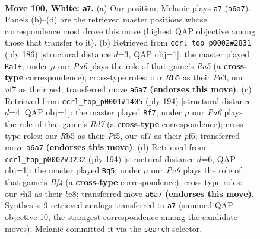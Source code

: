 \documentclass[11pt]{article}
\begin{document}
\clearpage

\begin{figure}[p]\centering
\begin{subfigure}{0.46\textwidth}\centering
\resizebox{\linewidth}{!}{%
\newchessgame
\chessboard[
  setfen={8/3k1n2/P7/1R6/8/7r/4K3/8 w - - 27 100},
  showmover=false,
  pgfstyle=straightmove, color=movearrow, markmove={a6-a7}
]}
\caption{}
\end{subfigure}\hfill
\begin{subfigure}{0.46\textwidth}\centering
\resizebox{\linewidth}{!}{%
\newchessgame
\chessboard[
  setfen={8/7r/8/R7/4p3/4P3/6K1/3k4 w - - 8 94},
  showmover=false,
  pgfstyle=straightmove, color=movearrow, markmove={a5-a1}
]}
\caption{}
\end{subfigure}
\\[4pt]
\begin{subfigure}{0.46\textwidth}\centering
\resizebox{\linewidth}{!}{%
\newchessgame
\chessboard[
  setfen={8/3R4/5p1k/5P2/1r6/5K2/8/8 w - - 8 98},
  showmover=false,
  pgfstyle=straightmove, color=movearrow, markmove={d7-f7}
]}
\caption{}
\end{subfigure}\hfill
\begin{subfigure}{0.46\textwidth}\centering
\resizebox{\linewidth}{!}{%
\newchessgame
\chessboard[
  setfen={4b3/8/k7/2K5/5B2/7R/1n6/8 w - - 85 98},
  showmover=false,
  pgfstyle=straightmove, color=movearrow, markmove={f4-g5}
]}
\caption{}
\end{subfigure}
\caption{\textbf{Move 100, White: \texttt{a7}.} (a) Our position; Melanie plays \texttt{a7} (\texttt{a6a7}). Panels (b)--(d) are the retrieved master positions whose correspondence most drove this move (highest QAP objective among those that transfer to it). (b) Retrieved from \texttt{ccrl\_top\_p0002\#2831} (ply 186) [structural distance $d$=3, QAP obj=1]: the master played \texttt{Ra1+}; under $\mu$ our \emph{Pa6} plays the role of that game's \emph{Ra5} (a \textbf{cross-type} correspondence); cross-type roles: our \emph{R}b5 as their \emph{P}e3, our \emph{n}f7 as their \emph{p}e4; transferred move \texttt{a6a7} \textbf{(endorses this move)}. (c) Retrieved from \texttt{ccrl\_top\_p0001\#1405} (ply 194) [structural distance $d$=4, QAP obj=1]: the master played \texttt{Rf7}; under $\mu$ our \emph{Pa6} plays the role of that game's \emph{Rd7} (a \textbf{cross-type} correspondence); cross-type roles: our \emph{R}b5 as their \emph{P}f5, our \emph{n}f7 as their \emph{p}f6; transferred move \texttt{a6a7} \textbf{(endorses this move)}. (d) Retrieved from \texttt{ccrl\_top\_p0002\#3232} (ply 194) [structural distance $d$=6, QAP obj=1]: the master played \texttt{Bg5}; under $\mu$ our \emph{Pa6} plays the role of that game's \emph{Bf4} (a \textbf{cross-type} correspondence); cross-type roles: our \emph{r}h3 as their \emph{b}e8; transferred move \texttt{a6a7} \textbf{(endorses this move)}. Synthesis: 9 retrieved analogs transferred to \texttt{a7} (summed QAP objective 10, the strongest correspondence among the candidate moves); Melanie committed it via the \texttt{search} selector.}
\label{fig:thought-m198}
\end{figure}
\end{document}
